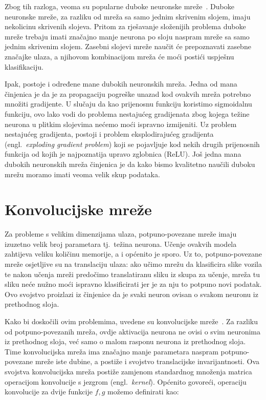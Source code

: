 \documentclass[times, utf8, zavrsni, numeric]{fer}
\begin{document}
Zbog tih razloga, veoma su popularne duboke neuronske mreže~\cite{Goodfellow-et-al-2016}. Duboke neuronske mreže, za razliku od mreža sa samo jednim skrivenim slojem, imaju nekolicinu skrivenih slojeva. 
Pritom za rješavanje složenijih problema duboke mreže trebaju imati značajno manje neurona po sloju naspram mreže sa samo jednim skrivenim slojem. 
Zasebni slojevi mreže naučit će prepoznavati zasebne značajke ulaza, a njihovom kombinacijom mreža će moći postići uspješnu klasifikaciju.

Ipak, postoje i određene mane dubokih neuronskih mreža. Jedna od mana činjenica je da je za propagaciju pogreške unazad kod ovakvih mreža potrebno množiti gradijente. 
U slučaju da kao prijenosnu funkciju koristimo sigmoidalnu funkciju, ovo lako vodi do problema nestajućeg gradijenata zbog kojega težine neurona u plitkim slojevima nećemo moći ispravno izmijeniti.
Uz problem nestajućeg gradijenta, postoji i problem eksplodirajućeg gradijenta (engl.\ \textit{exploding gradient problem}) koji se pojavljuje kod nekih drugih prijenosnih funkcija od kojih je najpoznatija upravo zglobnica (ReLU).
Još jedna mana dubokih neuronskih mreža činjenica je da kako bismo kvalitetno naučili duboku mrežu moramo imati veoma velik skup podataka.

\section{Konvolucijske mreže}
Za probleme s velikim dimenzijama ulaza, potpuno-povezane mreže imaju izuzetno velik broj parametara tj.\ težina neurona. 
Učenje ovakvih modela zahtijeva veliku količinu memorije, a i općenito je sporo. 
Uz to, potpuno-povezane mreže osjetljive su na translaciju ulaza: ako učimo mrežu da klasificira slike vozila te nakon učenja mreži predočimo translatiranu sliku iz skupa za učenje, mreža tu sliku neće nužno moći ispravno klasificirati jer je za nju to potpuno novi podatak.
Ovo svojstvo proizlazi iz činjenice da je svaki neuron ovisan o svakom neuronu iz prethodnog sloja.

Kako bi doskočili ovim problemima, uvedene su konvolucijske mreže~\cite{o2015introduction}. 
Za razliku od potpuno-povezanih mreža, ovdje aktivacija neurona ne ovisi o svim neuronima iz prethodnog sloja, već samo o malom rasponu neurona iz prethodnog sloja. 
Time konvolucijska mreža ima značajno manje parametara naspram potpuno-povezane mreže iste dubine, a postiže i svojstvo translacijske invarijantnosti.
Ova svojstva konvolucijska mreža postiže zamjenom standardnog množenja matrica operacijom konvolucije s jezgrom (engl.\ \textit{kernel}). 
Općenito govoreći, operaciju konvolucije za dvije funkcije $f, g$ možemo definirati kao:
\end{document}
